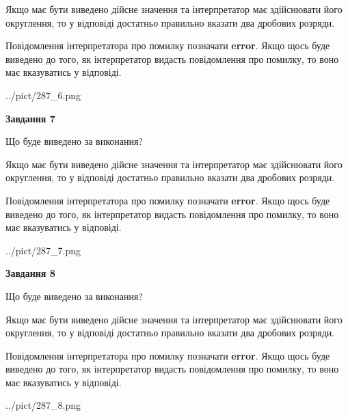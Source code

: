 \documentclass[12pt, ukrainian]{article}
\begin{document}
{\begin {Large}
Якщо має бути виведено дійсне значення та інтерпретатор має здійснювати його округлення, 
то у відповіді достатньо правильно вказати два дробових розряди.

Повідомлення інтерпретатора про помилку позначати \textbf{error}.
Якщо щось буде виведено до того, як інтерпретатор видасть повідомлення про помилку, 
то воно має вказуватись у відповіді. \par

\begin{center}
	{../pict/287_6.png}
\end{center}
\newpage

{\begin {center}\textbf{Завдання 7}\end {center}}\par
Що буде виведено за виконання? \par

Якщо має бути виведено дійсне значення та інтерпретатор має здійснювати його округлення, 
то у відповіді достатньо правильно вказати два дробових розряди.

Повідомлення інтерпретатора про помилку позначати \textbf{error}.
Якщо щось буде виведено до того, як інтерпретатор видасть повідомлення про помилку, 
то воно має вказуватись у відповіді. \par

\begin{center}
	{../pict/287_7.png}
\end{center}
\newpage

{\begin {center}\textbf{Завдання 8}\end {center}}\par
Що буде виведено за виконання? \par

Якщо має бути виведено дійсне значення та інтерпретатор має здійснювати його округлення, 
то у відповіді достатньо правильно вказати два дробових розряди.

Повідомлення інтерпретатора про помилку позначати \textbf{error}.
Якщо щось буде виведено до того, як інтерпретатор видасть повідомлення про помилку, 
то воно має вказуватись у відповіді. \par

\begin{center}
	{../pict/287_8.png}
\end{center}
\newpage


\end{Large}}
\end{document}
